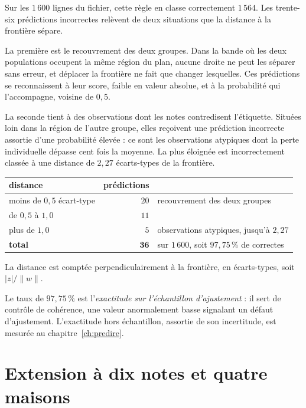 Sur les $1\,600$ lignes du fichier, cette règle en classe correctement $1\,564$.
Les trente-six prédictions incorrectes relèvent de deux situations que la
distance à la frontière sépare.

La première est le recouvrement des deux groupes. Dans la bande où les deux
populations occupent la même région du plan, aucune droite ne peut les séparer
sans erreur, et déplacer la frontière ne fait que changer lesquelles.
Ces prédictions se reconnaissent à leur score, faible en valeur absolue, et à la
probabilité qui l'accompagne, voisine de $0{,}5$.

La seconde tient à des observations dont les notes contredisent l'étiquette.
Situées loin dans la région de l'autre groupe, elles reçoivent une prédiction
incorrecte assortie d'une probabilité élevée : ce sont les observations atypiques
dont la perte individuelle dépasse cent fois la
moyenne. La plus éloignée est incorrectement classée à une distance de
$2{,}27$ écarts-types de la frontière.

\begin{chiffres}
\begin{center}
\begin{tabular}{lrl}
\toprule
distance & prédictions & \\
\midrule
moins de $0{,}5$ écart-type & $20$ & recouvrement des deux groupes \\
de $0{,}5$ à $1{,}0$        & $11$ & \\
plus de $1{,}0$             & $5$  & observations atypiques, jusqu'à $2{,}27$ \\
\midrule
\textbf{total}              & $\mathbf{36}$ & sur $1\,600$, soit $97{,}75\,\%$ de correctes \\
\bottomrule
\end{tabular}
\end{center}
La distance est comptée perpendiculairement à la frontière, en écarts-types, soit
$|z|/\|w\|$.
\end{chiffres}

Le taux de $97{,}75\,\%$ est l'\emph{exactitude sur l'échantillon
d'ajustement} : il sert de contrôle de cohérence, une valeur anormalement basse
signalant un défaut d'ajustement. L'exactitude hors échantillon, assortie de son
incertitude, est mesurée au chapitre~\ref{ch:predire}.

\section{Extension à dix notes et quatre maisons}

